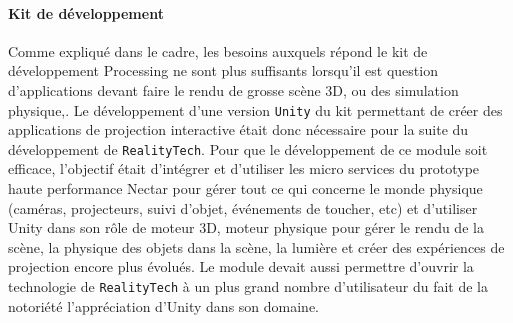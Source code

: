 \paragraph{Kit de développement} Comme expliqué dans le cadre, les besoins auxquels répond le kit de développement Processing ne sont plus suffisants lorsqu'il est question d'applications devant faire le rendu de grosse scène 3D, ou des simulation physique,. Le développement d'une version \texttt{Unity} du kit permettant de créer des applications de projection interactive était donc nécessaire pour la suite du développement de \texttt{RealityTech}. Pour que le développement de ce module soit efficace, l'objectif était d'intégrer et d'utiliser les micro services du prototype haute performance Nectar pour gérer tout ce qui concerne le monde physique (caméras, projecteurs, suivi d'objet, événements de toucher, etc) et d'utiliser Unity dans son rôle de moteur 3D, moteur physique pour gérer le rendu de la scène, la physique des objets dans la scène, la lumière et créer des expériences de projection encore plus évolués. Le module devait aussi permettre d'ouvrir la technologie de \texttt{RealityTech} à un plus grand nombre d'utilisateur du fait de la notoriété l'appréciation d'Unity dans son domaine. 